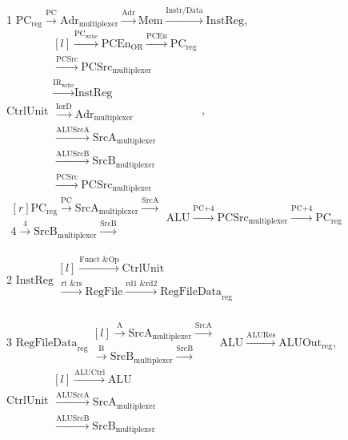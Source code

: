 \documentclass{article}
\begin{document}
\begin{enumerate}
1 $\text{PC}_\text{reg} \xrightarrow{\text{PC}} \text{Adr}_\text{multiplexer} \xrightarrow{\text{Adr}} \text{Mem} \xrightarrow{\text{Instr/Data}} \text{InstReg}$, $\text{CtrlUnit} \begin{matrix*}[l] 
\xrightarrow{\text{PC}_\text{write}} \text{PCEn}_\text{OR} \xrightarrow{\text{PCEn}} \text{PC}_\text{reg} \\ 
\xrightarrow{\text{PCSrc}} \text{PCSrc}_\text{multiplexer} \\
\xrightarrow{\text{IR}_\text{write}} \text{InstReg} \\
\xrightarrow{\text{IorD}} \text{Adr}_\text{multiplexer} \\ \xrightarrow{\text{ALUSrcA}} \text{SrcA}_\text{multiplexer} \\ \xrightarrow{\text{ALUSrcB}} \text{SrcB}_\text{multiplexer} \\ \xrightarrow{\text{PCSrc}} \text{PCSrc}_\text{multiplexer} \end{matrix*}$,\\ $\begin{matrix*}[r] \text{PC}_\text{reg} \xrightarrow{\text{PC}} \text{SrcA}_\text{multiplexer} \xrightarrow{\text{SrcA}} \\ \text{4} \xrightarrow{\text{4}} \text{SrcB}_\text{multiplexer} \xrightarrow{\text{SrcB}}\end{matrix*} \text{ALU} \xrightarrow{\text{PC+4}} \text{PCSrc}_\text{multiplexer} \xrightarrow{\text{PC+4}} \text{PC}_\text{reg}$\\

\bigbreak

2 $\text{InstReg} \begin{matrix*}[l] 
\xrightarrow{\text{Funct \& Op}} \text{CtrlUnit} \\ \xrightarrow{\text{rt \& rs}} \text{RegFile} \xrightarrow{\text{rd1 \& rd2}} \text{RegFileData}_\text{reg} \\ \end{matrix*}$\\

\bigbreak

3 $\text{RegFileData}_\text{reg} \begin{matrix*}[l] \xrightarrow{\text{A}} \text{SrcA}_\text{multiplexer} \xrightarrow{\text{SrcA}} \\ \xrightarrow{\text{B}} \text{SrcB}_\text{multiplexer} \xrightarrow{\text{SrcB}} \end{matrix*} \text{ALU} \xrightarrow{\text{ALURes}} \text{ALUOut}_\text{reg}$, $\text{CtrlUnit} \begin{matrix*}[l] 
\xrightarrow{\text{ALUCtrl}} \text{ALU} \\ \xrightarrow{\text{ALUSrcA}} \text{SrcA}_\text{multiplexer} \\ \xrightarrow{\text{ALUSrcB}} \text{SrcB}_\text{multiplexer} \end{matrix*}$\\


\end{enumerate}
\end{document}
